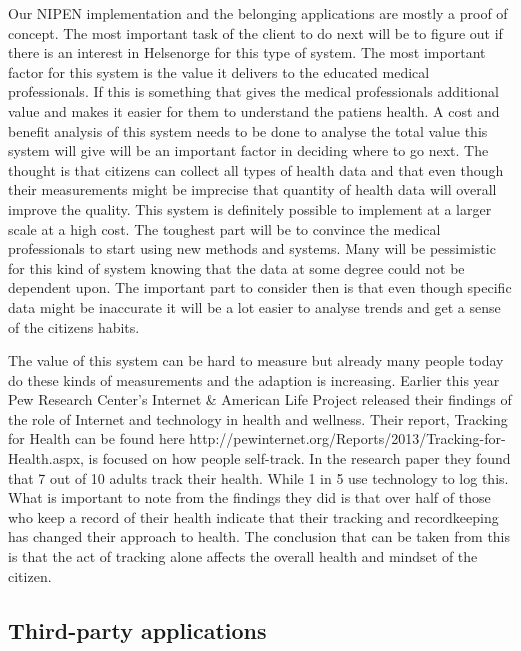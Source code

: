 \iffalse
Our NIPEN implementation and the belonging applications are mostly a proof of concept. 
The most important task of the client to do next will be to figure out if there is an interest in Helsenorge for this type of system.
The most important factor for this system is the value it delivers to the educated medical professionals. 
If this is something that gives the medical professionals additional value and makes it easier for them to understand the patiens health. 
A cost and benefit analysis of this system needs to be done to analyse the total value this system will give will be an important factor in deciding where to go next.
The thought is that citizens can collect all types of health data and that even though their measurements might be imprecise that quantity of health data will overall improve the quality.
This system is definitely possible to implement at a larger scale at a high cost.
The toughest part will be to convince the medical professionals to start using new methods and systems. 
Many will be pessimistic for this kind of system knowing that the data at some degree could not be dependent upon.
The important part to consider then is that even though specific data might be inaccurate it will be a lot easier to analyse trends and get a sense of the citizens habits. 

The value of this system can be hard to measure but already many people today do these kinds of measurements and the adaption is increasing. 
Earlier this year Pew Research Center’s Internet \& American Life Project released their findings of the role of Internet and technology in health and wellness. 
Their report, Tracking for Health can be found here http://pewinternet.org/Reports/2013/Tracking-for-Health.aspx, is focused on how people self-track.
In the research paper they found that 7 out of 10 adults track their health.
While 1 in 5 use technology to log this. 
What is important to note from the findings they did is that over half of those who keep a record of their health indicate that their tracking and recordkeeping has changed their approach to health.
The conclusion that can be taken from this is that the act of tracking alone affects the overall health and mindset of the citizen. 

\subsection{Third-party applications}

